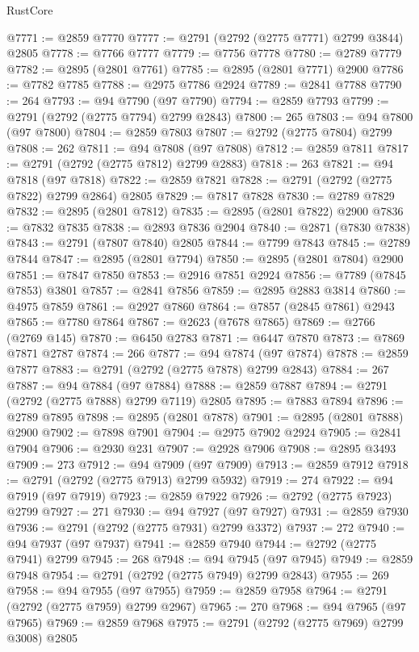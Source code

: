 \begin{lexlean}{RustCore}
\begin{coremodule}
@7771 := @2859 @7770
@7777 := @2791 (@2792 (@2775 @7771) @2799 @3844) @2805
@7778 := @7766 @7777
@7779 := @7756 @7778
@7780 := @2789 @7779
@7782 := @2895 (@2801 @7761)
@7785 := @2895 (@2801 @7771) @2900
@7786 := @7782 @7785
@7788 := @2975 @7786 @2924
@7789 := @2841 @7788
@7790 := 264
@7793 := @94 @7790 (@97 @7790)
@7794 := @2859 @7793
@7799 := @2791 (@2792 (@2775 @7794) @2799 @2843)
@7800 := 265
@7803 := @94 @7800 (@97 @7800)
@7804 := @2859 @7803
@7807 := @2792 (@2775 @7804) @2799
@7808 := 262
@7811 := @94 @7808 (@97 @7808)
@7812 := @2859 @7811
@7817 := @2791 (@2792 (@2775 @7812) @2799 @2883)
@7818 := 263
@7821 := @94 @7818 (@97 @7818)
@7822 := @2859 @7821
@7828 := @2791 (@2792 (@2775 @7822) @2799 @2864) @2805
@7829 := @7817 @7828
@7830 := @2789 @7829
@7832 := @2895 (@2801 @7812)
@7835 := @2895 (@2801 @7822) @2900
@7836 := @7832 @7835
@7838 := @2893 @7836 @2904
@7840 := @2871 (@7830 @7838)
@7843 := @2791 (@7807 @7840) @2805
@7844 := @7799 @7843
@7845 := @2789 @7844
@7847 := @2895 (@2801 @7794)
@7850 := @2895 (@2801 @7804) @2900
@7851 := @7847 @7850
@7853 := @2916 @7851 @2924
@7856 := @7789 (@7845 @7853) @3801
@7857 := @2841 @7856
@7859 := @2895 @2883 @3814
@7860 := @4975 @7859
@7861 := @2927 @7860
@7864 := @7857 (@2845 @7861) @2943
@7865 := @7780 @7864
@7867 := @2623 (@7678 @7865)
@7869 := @2766 (@2769 @145)
@7870 := @6450 @2783
@7871 := @6447 @7870
@7873 := @7869 @7871 @2787
@7874 := 266
@7877 := @94 @7874 (@97 @7874)
@7878 := @2859 @7877
@7883 := @2791 (@2792 (@2775 @7878) @2799 @2843)
@7884 := 267
@7887 := @94 @7884 (@97 @7884)
@7888 := @2859 @7887
@7894 := @2791 (@2792 (@2775 @7888) @2799 @7119) @2805
@7895 := @7883 @7894
@7896 := @2789 @7895
@7898 := @2895 (@2801 @7878)
@7901 := @2895 (@2801 @7888) @2900
@7902 := @7898 @7901
@7904 := @2975 @7902 @2924
@7905 := @2841 @7904
@7906 := @2930 @231
@7907 := @2928 @7906
@7908 := @2895 @3493
@7909 := 273
@7912 := @94 @7909 (@97 @7909)
@7913 := @2859 @7912
@7918 := @2791 (@2792 (@2775 @7913) @2799 @5932)
@7919 := 274
@7922 := @94 @7919 (@97 @7919)
@7923 := @2859 @7922
@7926 := @2792 (@2775 @7923) @2799
@7927 := 271
@7930 := @94 @7927 (@97 @7927)
@7931 := @2859 @7930
@7936 := @2791 (@2792 (@2775 @7931) @2799 @3372)
@7937 := 272
@7940 := @94 @7937 (@97 @7937)
@7941 := @2859 @7940
@7944 := @2792 (@2775 @7941) @2799
@7945 := 268
@7948 := @94 @7945 (@97 @7945)
@7949 := @2859 @7948
@7954 := @2791 (@2792 (@2775 @7949) @2799 @2843)
@7955 := 269
@7958 := @94 @7955 (@97 @7955)
@7959 := @2859 @7958
@7964 := @2791 (@2792 (@2775 @7959) @2799 @2967)
@7965 := 270
@7968 := @94 @7965 (@97 @7965)
@7969 := @2859 @7968
@7975 := @2791 (@2792 (@2775 @7969) @2799 @3008) @2805

\end{coremodule}
\end{lexlean}
